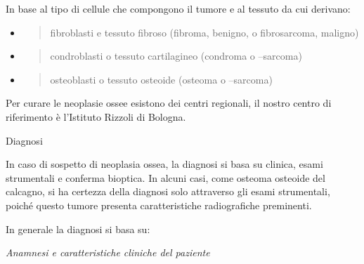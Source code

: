 \documentclass[]{article}
\begin{document}
In base al tipo di cellule che compongono il tumore e al tessuto da cui
derivano:

\begin{itemize}
\item
  \begin{quote}
  fibroblasti e tessuto fibroso (fibroma, benigno, o fibrosarcoma,
  maligno)
  \end{quote}
\item
  \begin{quote}
  condroblasti o tessuto cartilagineo (condroma o --sarcoma)
  \end{quote}
\item
  \begin{quote}
  osteoblasti o tessuto osteoide (osteoma o --sarcoma)
  \end{quote}
\end{itemize}

Per curare le neoplasie ossee esistono dei centri regionali, il nostro
centro di riferimento è l'Istituto Rizzoli di Bologna.

Diagnosi

In caso di sospetto di neoplasia ossea, la diagnosi si basa su clinica,
esami strumentali e conferma bioptica. In alcuni casi, come osteoma
osteoide del calcagno, si ha certezza della diagnosi solo attraverso gli
esami strumentali, poiché questo tumore presenta caratteristiche
radiografiche preminenti.

In generale la diagnosi si basa su:

\emph{Anamnesi e caratteristiche cliniche del paziente}
\end{document}
